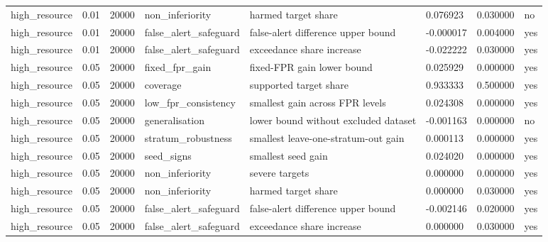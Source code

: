 \begin{tabular}{llllllll}
high\_resource & 0.01 & 20000 & non\_inferiority & harmed target share & 0.076923 & 0.030000 & no \\
high\_resource & 0.01 & 20000 & false\_alert\_safeguard & false-alert difference upper bound & -0.000017 & 0.004000 & yes \\
high\_resource & 0.01 & 20000 & false\_alert\_safeguard & exceedance share increase & -0.022222 & 0.030000 & yes \\
high\_resource & 0.05 & 20000 & fixed\_fpr\_gain & fixed-FPR gain lower bound & 0.025929 & 0.000000 & yes \\
high\_resource & 0.05 & 20000 & coverage & supported target share & 0.933333 & 0.500000 & yes \\
high\_resource & 0.05 & 20000 & low\_fpr\_consistency & smallest gain across FPR levels & 0.024308 & 0.000000 & yes \\
high\_resource & 0.05 & 20000 & generalisation & lower bound without excluded dataset & -0.001163 & 0.000000 & no \\
high\_resource & 0.05 & 20000 & stratum\_robustness & smallest leave-one-stratum-out gain & 0.000113 & 0.000000 & yes \\
high\_resource & 0.05 & 20000 & seed\_signs & smallest seed gain & 0.024020 & 0.000000 & yes \\
high\_resource & 0.05 & 20000 & non\_inferiority & severe targets & 0.000000 & 0.000000 & yes \\
high\_resource & 0.05 & 20000 & non\_inferiority & harmed target share & 0.000000 & 0.030000 & yes \\
high\_resource & 0.05 & 20000 & false\_alert\_safeguard & false-alert difference upper bound & -0.002146 & 0.020000 & yes \\
high\_resource & 0.05 & 20000 & false\_alert\_safeguard & exceedance share increase & 0.000000 & 0.030000 & yes \\
\bottomrule
\end{tabular}
